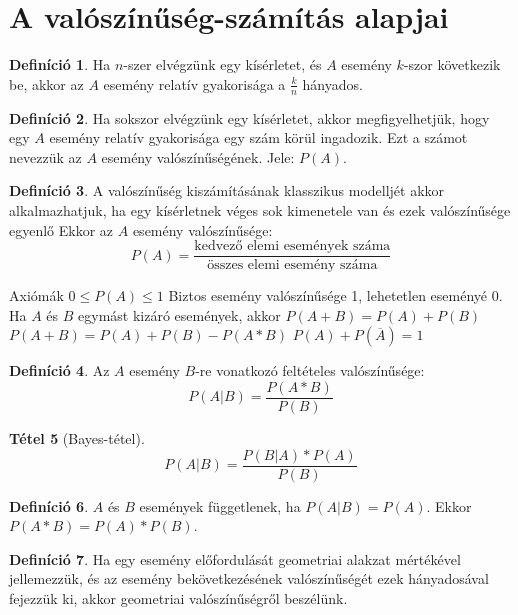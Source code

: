 \documentclass[twoside,12pt]{report}
\newtheorem{theorem}{Tétel}[section]
\theoremstyle{definition}
\newtheorem{definition}[theorem]{Definíció}
\begin{document}
\section{A valószínűség-számítás alapjai}
	\begin{definition}
		Ha $n$-szer elvégzünk egy kísérletet, és $A$ esemény $k$-szor következik be, akkor az $A$ esemény relatív gyakorisága a $\frac{k}{n}$ hányados.
	\end{definition}
	\begin{definition}
		Ha sokszor elvégzünk egy kísérletet, akkor megfigyelhetjük, hogy egy $A$ esemény
		relatív gyakorisága egy szám körül ingadozik. Ezt a számot nevezzük az $A$ esemény valószínűségének. Jele: $P(A)$.
	\end{definition}
	\begin{definition}
		A valószínűség kiszámításának klasszikus modelljét akkor alkalmazhatjuk, ha egy kísérletnek véges sok kimenetele van és ezek valószínűsége egyenlő Ekkor az $A$ esemény valószínűsége:
		\begin{equation*}
			P(A)=\frac{\text{kedvező elemi események száma}}{\text{összes elemi esemény száma}}
		\end{equation*}
	\end{definition}
	\begin{outline}
		\1 Axiómák
			\2 $0\le P(A)\le1$
			\2 Biztos esemény valószínűsége 1, lehetetlen eseményé 0.
			\2 Ha $A$ és $B$ egymást kizáró események, akkor $P(A+B)=P(A)+P(B)$
			\2 $P(A+B)=P(A)+P(B)-P(A*B)$
			\2 $P(A)+P(\overline{A})=1$
	\end{outline}
	\begin{definition}
		Az $A$ esemény $B$-re vonatkozó feltételes valószínűsége: \\
		\begin{equation*}
			P(A|B)=\frac{P(A*B)}{P(B)}
		\end{equation*}
	\end{definition}
	\begin{theorem}[Bayes-tétel]
		\begin{equation*}
			P(A|B)=\frac{P(B|A)*P(A)}{P(B)}
		\end{equation*}	
	\end{theorem}
	\begin{definition}
		$A$ és $B$ események függetlenek, ha $P(A|B)=P(A)$. Ekkor $P(A*B)=P(A)*P(B)$.
	\end{definition}
	\begin{definition}
		Ha egy esemény előfordulását geometriai alakzat mértékével jellemezzük, és az esemény bekövetkezésének valószínűségét ezek hányadosával fejezzük ki, akkor geometriai valószínűségről beszélünk.
	\end{definition}
\end{document}
